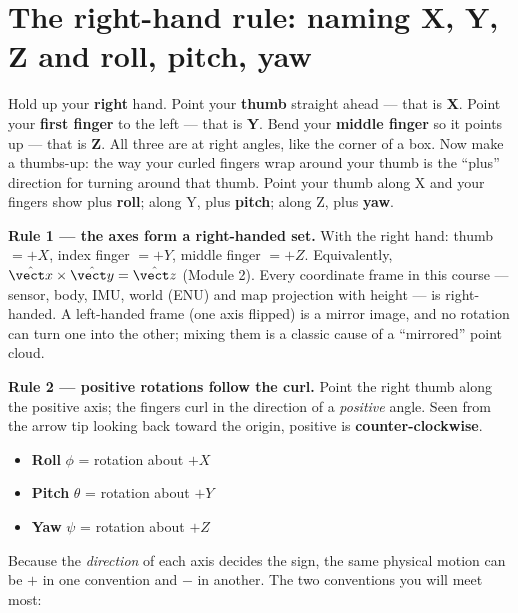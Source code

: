 \section{The right-hand rule: naming X, Y, Z and roll, pitch, yaw}
\begin{kid}
Hold up your \textbf{right} hand. Point your \textbf{thumb} straight ahead --- that is \textbf{X}. Point your \textbf{first finger} to the left --- that is \textbf{Y}. Bend your \textbf{middle finger} so it points up --- that is \textbf{Z}. All three are at right angles, like the corner of a box. Now make a thumbs-up: the way your curled fingers wrap around your thumb is the ``plus'' direction for turning around that thumb. Point your thumb along X and your fingers show plus \textbf{roll}; along Y, plus \textbf{pitch}; along Z, plus \textbf{yaw}.
\end{kid}


\begin{eng}
\textbf{Rule 1 --- the axes form a right-handed set.} With the right hand: thumb $=+X$, index finger $=+Y$, middle finger $=+Z$. Equivalently, $\hat{\vect x}\times\hat{\vect y}=\hat{\vect z}$ (Module 2). Every coordinate frame in this course --- sensor, body, IMU, world (ENU) and map projection with height --- is right-handed. A left-handed frame (one axis flipped) is a mirror image, and no rotation can turn one into the other; mixing them is a classic cause of a ``mirrored'' point cloud.

\textbf{Rule 2 --- positive rotations follow the curl.} Point the right thumb along the positive axis; the fingers curl in the direction of a \emph{positive} angle. Seen from the arrow tip looking back toward the origin, positive is \textbf{counter-clockwise}.
\begin{itemize}
\item \textbf{Roll} $\phi$ = rotation about $+X$
\item \textbf{Pitch} $\theta$ = rotation about $+Y$
\item \textbf{Yaw} $\psi$ = rotation about $+Z$
\end{itemize}
Because the \emph{direction} of each axis decides the sign, the same physical motion can be $+$ in one convention and $-$ in another. The two conventions you will meet most:
\end{eng}

